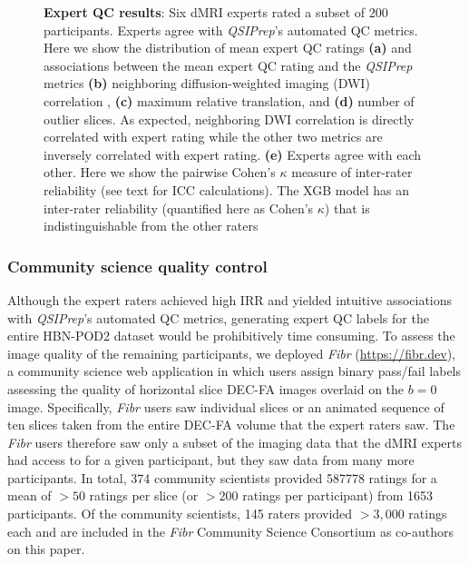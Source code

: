 \documentclass[9pt,lineno]{elife}
\begin{document}
\begin{figure}[tbp]
\begin{fullwidth}
\begin{subfigure}{.4\linewidth}
    \end{subfigure}
    \caption{%
        {\bf Expert QC results}:
        Six dMRI experts rated a subset of \num{200} participants.  Experts agree
        with \emph{QSIPrep}'s automated QC metrics.  Here we show the
        distribution of mean expert QC ratings \textbf{(a)} and associations
        between the mean expert QC rating and the \emph{QSIPrep} metrics
        \textbf{(b)} neighboring diffusion-weighted imaging (DWI) correlation 
        \citep{yeh2019-kb}, \textbf{(c)} maximum relative translation, and
        \textbf{(d)} number of outlier slices. As expected, neighboring DWI correlation is directly
        correlated with expert rating while the other two metrics are inversely
        correlated with expert rating.
        \textbf{(e)} Experts agree with each other. Here we show the pairwise
        Cohen's $\kappa$ measure of inter-rater reliability (see text for ICC
        calculations). The XGB model has an inter-rater reliability (quantified
        here as Cohen's $\kappa$) that is indistinguishable from the other
        raters
    }
    \label{fig:expert-qc}
\end{fullwidth}
\end{figure}

\subsubsection{Community science quality control}

Although the expert raters achieved high IRR and yielded intuitive associations
with \emph{QSIPrep}'s automated QC metrics, generating expert QC labels for the
entire HBN-POD2 dataset would be prohibitively time consuming. To assess the
image quality of the remaining participants, we deployed \emph{Fibr}
(\url{https://fibr.dev}), a community science web application in which users
assign binary pass/fail labels assessing the quality of horizontal slice DEC-FA
images overlaid on the $b=0$ image. Specifically, \emph{Fibr} users saw individual
slices or an animated sequence of ten slices taken from the entire DEC-FA volume
that the expert raters saw. The \emph{Fibr} users therefore saw only a subset of
the imaging data that the dMRI experts had access to for a given participant, but they
saw data from many more participants. In total, \num{374} community scientists provided
\num{587778} ratings for a mean of $>50$ ratings per slice (or $>200$ ratings
per participant) from \num{1653} participants. Of the community scientists, \num{145}
raters provided $>3,000$ ratings each and are included in the \emph{Fibr} Community
Science Consortium as co-authors on this paper.
\end{document}
